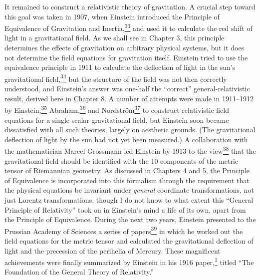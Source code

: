 It remained to construct a relativistic theory of gravitation. A crucial step
toward this goal was taken in 1907, when Einstein introduced the Principle of
Equivalence of Gravitation and
Inertia,\hyperref[ch1-ref-33]{\textsuperscript{33}} and used it to calculate
the red shift of light in a gravitational field. As we shall see in Chapter 3,
this principle determines the effects of gravitation on arbitrary physical
systems, but it does not determine the field equations for gravitation itself.
Einstein tried to use the equivalence principle in 1911 to calculate the
deflection of light in the sun's gravitational
field,\hyperref[ch1-ref-34]{\textsuperscript{34}} but the structure of the
field was not then correctly understood, and Einstein's answer was one-half
the ``correct'' general-relativistic result, derived here in Chapter 8. A
number of attempts were made in 1911--1912 by
Einstein,\hyperref[ch1-ref-35]{\textsuperscript{35}}
Abraham,\hyperref[ch1-ref-36]{\textsuperscript{36}} and
Nordstr\"om\hyperref[ch1-ref-37]{\textsuperscript{37}} to construct
relativistic field equations for a single scalar gravitational field, but
Einstein soon became dissatisfied with all such theories, largely on
aesthetic grounds. (The gravitational deflection of light by the sun had not
yet been measured.) A collaboration with the mathematician Marcel Grossmann
led Einstein by 1913 to the
view\hyperref[ch1-ref-38]{\textsuperscript{38}} that the gravitational field
should be identified with the 10 components of the metric tensor of
Riemannian geometry. As discussed in Chapters 4 and 5, the Principle of
Equivalence is incorporated into this formalism through the requirement that
the physical equations be invariant under \emph{general} coordinate
transformations, not just Lorentz transformations, though I do not know to
what extent this ``General Principle of Relativity'' took on in Einstein's
mind a life of its own, apart from the Principle of Equivalence. During the
next two years, Einstein presented to the Prussian Academy of Sciences a
series of papers\hyperref[ch1-ref-39]{\textsuperscript{39}} in which he worked
out the field equations for the metric tensor and calculated the
gravitational deflection of light and the precession of the perihelia of
Mercury. These magnificent achievements were finally summarized by Einstein
in his 1916 paper,\hyperref[ch1-ref-1]{\textsuperscript{1}} titled ``The
Foundation of the General Theory of Relativity.''
